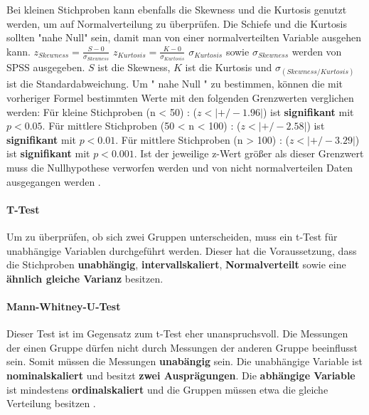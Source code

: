 \documentclass[a4paper,11pt]{article}%
\renewcommand{\\}{\vspace*{0.5\baselineskip} \newline}
\begin{document}
Bei kleinen Stichproben kann ebenfalls die Skewness und die Kurtosis genutzt werden, um auf Normalverteilung zu überprüfen. 
Die Schiefe und die Kurtosis sollten "nahe Null" sein, damit man von einer normalverteilten Variable ausgehen kann.\\
$ z_{Skewness} = \frac{S-0}{\sigma_{Skewness}} $ \\
$ z_{Kurtosis} = \frac{K-0}{\sigma_{Kurtosis}} $ \\
$\sigma_{Kurtosis}$ sowie $\sigma_{Skewness}$ werden von SPSS ausgegeben. $S$ ist die Skewness, $K$ ist die Kurtosis und ${\sigma_{(Skewness/Kurtosis)}}$ ist die Standardabweichung.
Um " nahe Null " zu bestimmen, können die mit vorheriger Formel bestimmten Werte mit den folgenden Grenzwerten verglichen werden:
Für kleine Stichproben (n < 50) : ($z < |+/-1.96|$) ist \textbf{signifikant} mit $p<0.05$. \newline
Für mittlere Stichproben (50 < n < 100) : ($z < |+/-2.58|$) ist \textbf{signifikant} mit $p<0.01$. \newline
Für mittlere Stichproben (n > 100) : ($z < |+/-3.29|$) ist \textbf{signifikant} mit $p<0.001$. \newline
Ist der jeweilige z-Wert größer als dieser Grenzwert muss die Nullhypothese verworfen werden und von nicht normalverteilen Daten ausgegangen werden \citep[p.184]{field2013discovering}.

\paragraph{T-Test}
Um zu überprüfen, ob sich zwei  Gruppen unterscheiden, muss ein t-Test für unabhängige Variablen durchgeführt werden.
Dieser hat die Voraussetzung, dass die Stichproben \textbf{unabhängig}, \textbf{intervallskaliert}, \textbf{Normalverteilt} sowie eine \textbf{ähnlich gleiche Varianz} besitzen.

\paragraph{Mann-Whitney-U-Test}
Dieser Test ist im Gegensatz zum t-Test eher unanspruchsvoll. Die Messungen der einen Gruppe dürfen nicht durch Messungen der anderen Gruppe beeinflusst sein. Somit müssen die Messungen \textbf{unabängig} sein. Die unabhängige Variable ist \textbf{nominalskaliert} und besitzt \textbf{zwei Ausprägungen}. Die \textbf{abhängige Variable} ist mindestens \textbf{ordinalskaliert}  und die Gruppen müssen etwa die gleiche Verteilung besitzen \citep{eid2017statistik}.
\end{document}
